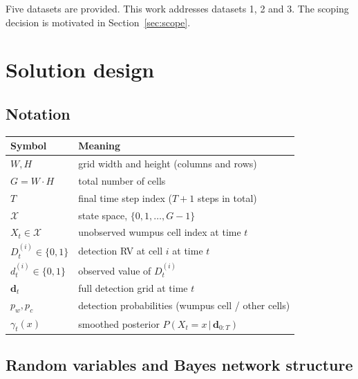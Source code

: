 \documentclass[11pt, a4paper]{article}
\newcommand{\given}{\,\vert\,}
\newcommand{\states}{\mathcal{X}}
\newcommand{\bd}{\mathbf{d}}
\begin{document}
Five datasets are provided. This work addresses datasets 1, 2 and 3. The scoping decision is motivated in
Section~\ref{sec:scope}.

\section{Solution design}
\label{sec:design}

\subsection{Notation}

\begin{center}\small
\begin{tabular}{@{}ll@{}}
\toprule
Symbol & Meaning \\
\midrule
$W, H$                  & grid width and height (columns and rows) \\
$G = W \cdot H$               & total number of cells \\
$T$                     & final time step index ($T{+}1$ steps in total) \\
$\states$               & state space, $\{0, 1, \ldots, G{-}1\}$ \\
$X_t \in \states$       & unobserved wumpus cell index at time $t$ \\
$D_t^{(i)} \in \{0,1\}$ & detection RV at cell $i$ at time $t$ \\
$d_t^{(i)} \in \{0,1\}$ & observed value of $D_t^{(i)}$ \\
$\bd_t$                 & full detection grid at time $t$ \\
$p_w, p_c$              & detection probabilities (wumpus cell / other cells) \\
$\gamma_t(x)$           & smoothed posterior $P(X_t = x \given \bd_{0:T})$ \\
\bottomrule
\end{tabular}
\end{center}

\subsection{Random variables and Bayes network structure}
\label{sec:bn}
\end{document}
